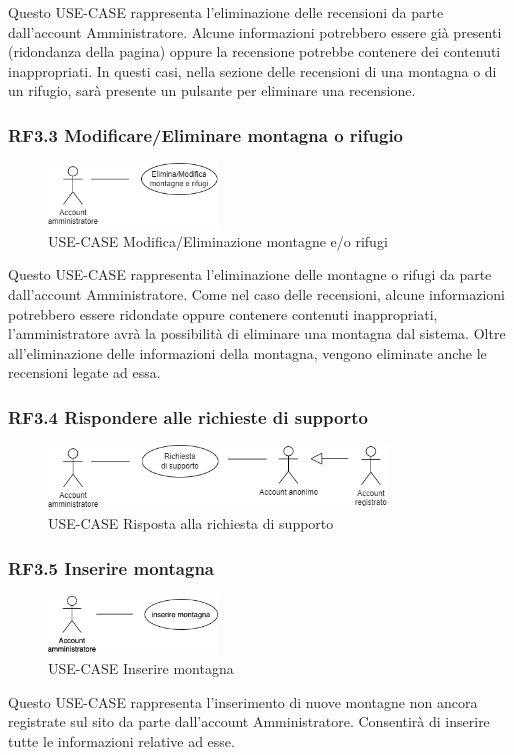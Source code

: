 \documentclass[a4paper,12pt]{article}
\begin{document}
Questo USE-CASE rappresenta l'eliminazione delle recensioni da parte dall'account Amministratore.
Alcune informazioni potrebbero essere già presenti (ridondanza della pagina) oppure la recensione potrebbe contenere dei contenuti inappropriati. 
In questi casi, nella sezione delle recensioni di una montagna o di un rifugio, sarà presente un pulsante per eliminare una recensione.

\subsubsection*{RF3.3 Modificare/Eliminare montagna o rifugio}
\begin{figure}[H]
   \centering
   \includegraphics[width=0.4\textwidth]{img/m_e_montagna_rifugio.png}
    \caption{USE-CASE Modifica/Eliminazione montagne e/o rifugi}
\end{figure}

Questo USE-CASE rappresenta l'eliminazione delle montagne o rifugi da parte dall'account Amministratore.
Come nel caso delle recensioni, alcune informazioni potrebbero essere ridondate oppure contenere contenuti inappropriati, l'amministratore avrà la possibilità di eliminare una montagna dal sistema.
Oltre all'eliminazione delle informazioni della montagna, vengono eliminate anche le recensioni legate ad essa. 

\subsubsection*{RF3.4 Rispondere alle richieste di supporto}

\begin{figure}[H]
   \centering
   \includegraphics[width=0.8\textwidth]{img/richiesta_supporto_amministratore.png}
    \caption{USE-CASE Risposta alla richiesta di supporto}
\end{figure}

\subsubsection*{RF3.5 Inserire montagna}
\begin{figure}[H]
   \centering
   \includegraphics[width=0.4\textwidth]{img/inserire_montagna.png}
    \caption{USE-CASE Inserire montagna}
\end{figure}
Questo USE-CASE rappresenta l'inserimento di nuove montagne non ancora registrate sul sito da parte dall'account Amministratore.
Consentirà di inserire tutte le informazioni relative ad esse.
\end{document}
